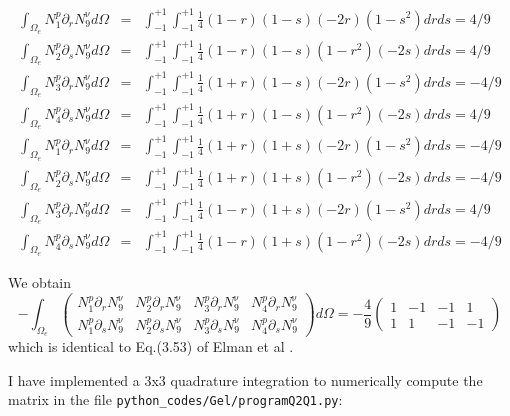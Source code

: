 \begin{tiny}
\begin{eqnarray}
\int_{\Omega_e}  N_1^p \partial_r N_9^\upnu d\Omega &=&  
\int_{-1}^{+1}\int_{-1}^{+1}\frac{1}{4}(1-r)(1-s)    (-2r)(1-s^2)  drds = 4/9 \\
\int_{\Omega_e}  N_2^p \partial_s N_9^\upnu d\Omega &=&  
\int_{-1}^{+1}\int_{-1}^{+1}\frac{1}{4}(1-r)(1-s)    (1-r^2)(-2s)  drds = 4/9 \\
\int_{\Omega_e}  N_3^p \partial_r N_9^\upnu d\Omega &=&  
\int_{-1}^{+1}\int_{-1}^{+1}\frac{1}{4}(1+r)(1-s)    (-2r)(1-s^2)  drds = -4/9 \\
\int_{\Omega_e}  N_4^p \partial_s N_9^\upnu d\Omega &=&  
\int_{-1}^{+1}\int_{-1}^{+1}\frac{1}{4}(1+r)(1-s)    (1-r^2)(-2s)  drds = 4/9 \\
\int_{\Omega_e}  N_1^p \partial_r N_9^\upnu d\Omega &=&  
\int_{-1}^{+1}\int_{-1}^{+1}\frac{1}{4}(1+r)(1+s)    (-2r)(1-s^2)  drds = -4/9 \\
\int_{\Omega_e}  N_2^p \partial_s N_9^\upnu d\Omega &=&  
\int_{-1}^{+1}\int_{-1}^{+1}\frac{1}{4}(1+r)(1+s)    (1-r^2)(-2s)  drds = -4/9  \\
\int_{\Omega_e}  N_3^p \partial_r N_9^\upnu d\Omega &=&  
\int_{-1}^{+1}\int_{-1}^{+1}\frac{1}{4}(1-r)(1+s)    (-2r)(1-s^2)  drds = 4/9 \\
\int_{\Omega_e}  N_4^p \partial_s N_9^\upnu d\Omega &=&  
\int_{-1}^{+1}\int_{-1}^{+1}\frac{1}{4}(1-r)(1+s)    (1-r^2)(-2s)  drds = -4/9 
\end{eqnarray}
\end{tiny}


We obtain 
\[
-\int_{\Omega_e}
\left(
\begin{array}{cccc}
N_1^p\partial_r N_9^\upnu & N_2^p\partial_r N_9^\upnu & N_3^p\partial_r N_9^\upnu & N_4^p\partial_r N_9^\upnu \\
N_1^p\partial_s N_9^\upnu & N_2^p\partial_s N_9^\upnu & N_3^p\partial_s N_9^\upnu & N_4^p\partial_s N_9^\upnu 
\end{array}
\right)
d\Omega 
=
- \frac{4}{9}
\left(
\begin{array}{cccc}
1 &-1 &-1 &1 \\
1 &1 &-1 &-1 
\end{array}
\right)
\]
which is identical to Eq.(3.53) of Elman et al \cite{elsw}.


I have implemented a 3x3 quadrature integration to numerically compute the matrix 
in the file {\tt python\_codes/Gel/programQ2Q1.py}:
 
